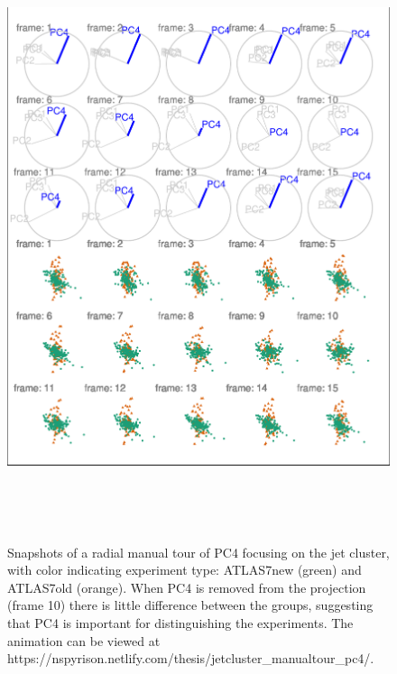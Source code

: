 \begin{Schunk}
\begin{figure}

{\centering \includegraphics[width=5.83in,height=7in]{spinifex_paper_files/figure-latex/JetClusterGood-1} 

}

\caption[Snapshots of a radial manual tour of PC4 focusing on the jet cluster, with color indicating experiment type]{Snapshots of a radial manual tour of PC4 focusing on the jet cluster, with color indicating experiment type: ATLAS7new (green) and ATLAS7old (orange).  When PC4 is removed from the projection (frame 10) there is little difference between the groups, suggesting that PC4 is important for distinguishing the experiments.  The animation can be viewed at https://nspyrison.netlify.com/thesis/jetcluster\_manualtour\_pc4/.}\label{fig:JetClusterGood}
\end{figure}
\end{Schunk}


